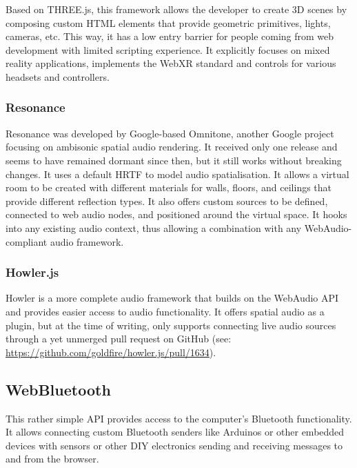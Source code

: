 Based on THREE.js, this framework allows the developer to create \ac{3D} scenes by composing custom HTML elements that provide geometric primitives, lights, cameras, etc. This way, it has a low entry barrier for people coming from web development with limited scripting experience. It explicitly focuses on mixed reality applications, implements the WebXR standard and controls for various headsets and controllers.

\subsubsection{Resonance}

Resonance was developed by Google-based Omnitone, another Google project focusing on ambisonic spatial audio rendering. It received only one release and seems to have remained dormant since then, but it still works without breaking changes. It uses a default \ac{HRTF} to model audio spatialisation. It allows a virtual room to be created with different materials for walls, floors, and ceilings that provide different reflection types. It also offers custom sources to be defined, connected to web audio nodes, and positioned around the virtual space. It hooks into any existing audio context, thus allowing a combination with any WebAudio-compliant audio framework.

\subsubsection{Howler.js}

Howler is a more complete audio framework that builds on the WebAudio \ac{API} and provides easier access to audio functionality. It offers spatial audio as a plugin, but at the time of writing, only supports connecting live audio sources through a yet unmerged pull request on GitHub (see: \href{https://github.com/goldfire/howler.js/pull/1634}{https://github.com/goldfire/howler.js/pull/1634}).


\subsection{WebBluetooth}

This rather simple \ac{API} provides access to the computer's Bluetooth functionality. It allows connecting custom Bluetooth senders like Arduinos or other embedded devices with sensors or other \ac{DIY} electronics sending and receiving messages to and from the browser.



